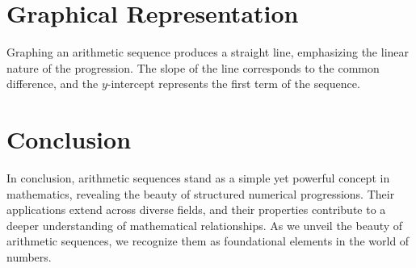 \documentclass{article}
\begin{document}
\section*{Graphical Representation}
Graphing an arithmetic sequence produces a straight line, emphasizing the linear nature of the progression. The slope of the line corresponds to the common difference, and the $y$-intercept represents the first term of the sequence.

\section*{Conclusion}
In conclusion, arithmetic sequences stand as a simple yet powerful concept in mathematics, revealing the beauty of structured numerical progressions. Their applications extend across diverse fields, and their properties contribute to a deeper understanding of mathematical relationships. As we unveil the beauty of arithmetic sequences, we recognize them as foundational elements in the world of numbers.
\end{document}

